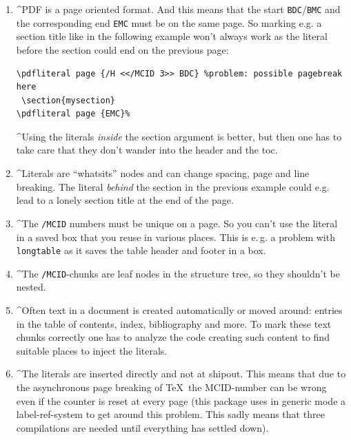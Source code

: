 \documentclass[DIV=12,parskip=half-,bibliography=totoc]{scrartcl}
\newcommand\PDF{PDF}
\begin{document}
\begin{enumerate}[beginpenalty=10000]
  \item \TagP^\PDF{} is a page oriented format. And this means that the start \texttt{BDC}/\texttt{BMC}  and the corresponding end \texttt{EMC} must be on the same page.
  So marking e.g. a section title like in the following example won't always work as the literal before the section could end on the previous page:\TagPend

\begin{lstlisting}
\pdfliteral page {/H <</MCID 3>> BDC} %problem: possible pagebreak here
 \section{mysection}
\pdfliteral page {EMC}%
\end{lstlisting}
\tagmcend\tagstructend

  \TagP^Using the literals \emph{inside} the section argument is better, but then one has to take care that they don't wander into the header and the toc.\Pmeti

  \item
  \TagP^Literals are \enquote{whatsits} nodes and can change spacing, page and line breaking. The literal \emph{behind} the section in the previous example could e.g. lead to a lonely section title at the end of the page.\Pmeti

  \item
   \TagP^The \texttt{/MCID} numbers must be unique on a page. So you can't use the literal in a saved box that you reuse in various places. This is e.\,g. a problem with \texttt{longtable} as it saves the table header and footer in a box.\Pmeti

  \item
  \TagP^The  \texttt{/MCID}-chunks are leaf nodes in the structure tree, so they shouldn't be nested.\Pmeti

  \item
  \TagP^Often text in a document is created automatically or moved around: entries in the table of contents, index, bibliography and more. To mark these text chunks correctly one has to analyze the code creating such content to find suitable places to inject the literals.\Pmeti

  \item
  \TagP^The literals are inserted directly and not at shipout. This means that due to the asynchronous page breaking of \TeX\ the MCID-number can be wrong even if the counter is reset at every page (this package uses in generic mode a label-ref-system to get around this problem. This sadly means that three compilations are needed until everything has settled down).\Pmeti


\end{enumerate}
\end{document}
